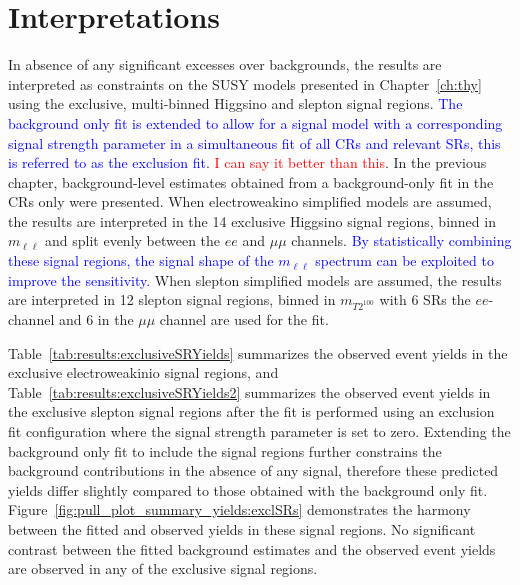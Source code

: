 \chapter{Interpretations}
\label{ch:interpretations}

In absence of any significant excesses over backgrounds, the results are interpreted as constraints on the SUSY models presented in Chapter~\ref{ch:thy} using the exclusive, multi-binned Higgsino and slepton signal regions.  \textcolor{blue}{The background only fit is extended to allow for a signal model with a corresponding signal strength parameter in a simultaneous fit of all CRs and relevant SRs, this is referred to as the exclusion fit}.  \textcolor{red}{I can say it better than this}.  In the previous chapter, background-level estimates obtained from a background-only fit in the CRs only were presented.  When electroweakino simplified models are assumed, the results are interpreted in the 14 exclusive Higgsino signal regions, binned in $m_{\ell\ell}$ and split evenly between the $ee$ and $\mu\mu$ channels.  \textcolor{blue}{By statistically combining these signal regions, the signal shape of the $m_{\ell\ell}$ spectrum can be exploited to improve the sensitivity.} When slepton simplified models are assumed, the results are interpreted in 12 slepton signal regions, binned in $m_{T2^{100}}$ with 6 SRs the $ee$-channel and 6 in the $\mu\mu$ channel are used for the fit.

Table~\ref{tab:results:exclusiveSRYields} summarizes the observed event yields in the exclusive electroweakinio signal regions, and Table~\ref{tab:results:exclusiveSRYields2} summarizes the observed event yields in the exclusive slepton signal regions after the fit is performed using an exclusion fit configuration where the signal strength parameter is set to zero.  Extending the background only fit to include the signal regions further constrains the background contributions in the absence of any signal, therefore these predicted yields differ slightly compared to those obtained with the background only fit.  Figure~\ref{fig:pull_plot_summary_yields:exclSRs} demonstrates the harmony between the fitted and observed yields in these signal regions.  No significant contrast between the fitted background estimates and the observed event yields are observed in any of the exclusive signal regions.

